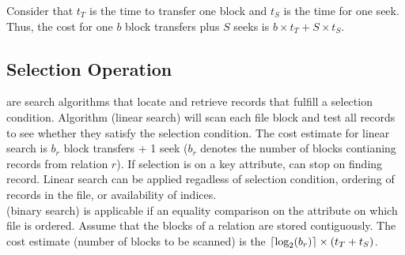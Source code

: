 \documentclass{article}
\begin{document}
Consider that $t_T$ is the time to transfer one block and $t_S$ is the time for one seek. Thus, the cost for one $b$ block transfers plus $S$ seeks is $b \times t_T + S \times t_S$. 

\subsection{Selection Operation}

 are search algorithms that locate and retrieve records that fulfill a selection condition. Algorithm  (linear search) will scan each file block and test all records to see whether they satisfy the selection condition. The cost estimate for linear search is $b_r$ block transfers + 1 seek ($b_r$ denotes the number of blocks contianing records from relation $r$). If selection is on a key attribute, can stop on finding record. Linear search can be applied regadless of selection condition, ordering of records in the file, or availability of indices. \\ 

 (binary search) is applicable if an equality comparison on the attribute on which file is ordered. Assume that the blocks of a relation are stored contiguously. The cost estimate (number of blocks to be scanned) is the $\left\lceil \textrm{log}_2 (b_r) \right\rceil \times (t_T + t_S)$. 
\end{document}
